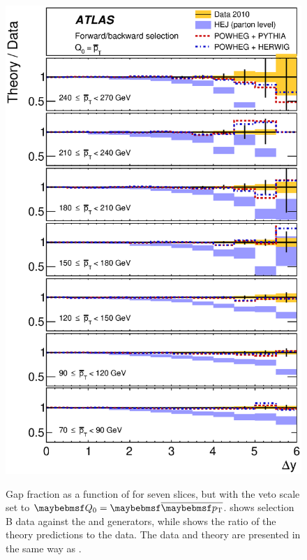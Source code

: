 \begin{figure}[htpb]
{    \includegraphics[width=\smallfigwidth]{chapters/gbj/GapFraction_YDist_gap_ptbar_sel_B_Ratio.eps}
    \label{fig:gbj:Gap_fraction_dY_Bp_ratio}}
  \caption{Gap fraction as a function of \DeltaY for seven \pTbar slices, but with
           the veto scale set to $\Qnought = \pTbar$. \protect{}
           shows selection B data against the \HEJ and \Powheg generators, while \protect{}
           shows the ratio of the theory predictions to the data. The data and theory
           are presented in the same way as .}
  \label{fig:gbj:Gap_fraction_dY_Bp}
\end{figure}

